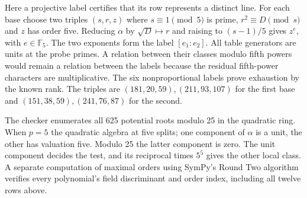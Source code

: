 Here a projective label certifies that its row represents a distinct line. For each base choose two triples $(s,r,z)$ where $s\equiv1\pmod5$ is prime, $r^2\equiv D\pmod s$ and $z$ has order five. Reducing $\alpha$ by $\sqrt D\mapsto r$ and raising to $(s-1)/5$ gives $z^e$, with $e\in\mathbb F_5$. The two exponents form the label $[e_1:e_2]$. All table generators are units at the probe primes. A relation between their classes modulo fifth powers would remain a relation between the labels because the residual fifth-power characters are multiplicative. The six nonproportional labels prove exhaustion by the known rank. The triples are $(181,20,59),(211,93,107)$ for the first base and $(151,38,59),(241,76,87)$ for the second.

The checker enumerates all 625 potential roots modulo 25 in the quadratic ring. When $p=5$ the quadratic algebra at five splits; one component of $\alpha$ is a unit, the other has valuation five. Modulo 25 the latter component is zero. The unit component decides the test, and its reciprocal times $5^5$ gives the other local class. A separate computation of maximal orders using SymPy's Round Two algorithm verifies every polynomial's field discriminant and order index, including all twelve rows above.

